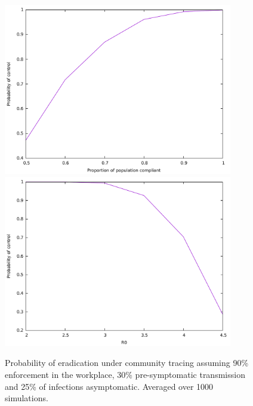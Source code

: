 \documentclass{article}
\begin{document}
\begin{figure}
\begin{center}
\includegraphics[width = 10cm]{mobileTracing25Subclinical30pre.pdf}
\includegraphics[width = 10cm]{mobileTracing25Subclinical30preR0.pdf}
\end{center}
\caption{Probability of eradication under community tracing assuming 90\% enforcement in the workplace, 30\% pre-symptomatic transmission and 25\% of infections asymptomatic. Averaged over 1000 simulations.}
\label{fulltrace25}
\end{figure}
\end{document}
